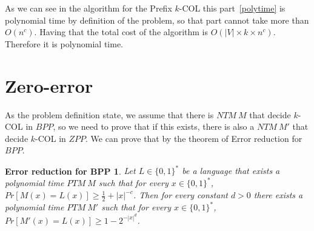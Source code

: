 \documentclass[12pt, a4paper]{article}
\begin{document}
As we can see in the algorithm for the Prefix $k$-COL this part~\ref{polytime} is polynomial time by definition of the problem, so that part cannot take more than $O(n^c)$. Having that the total cost of the algorithm is $O(|V| \times k \times n^c)$. Therefore it is polynomial time.

\section{Zero-error}
As the problem definition state, we assume that there is $NTM\ M$ that decide $k$-COL in $BPP$, so we need to prove that if this exists, there is also a $NTM\ M'$ that decide $k$-COL in $ZPP$. We can prove that by the theorem of Error reduction for $BPP$.

\newtheorem{bpperror}{Error reduction for BPP}\label{bpp:error}
\begin{bpperror}
  Let $L \in \{0,1\}^*$ be a language that exists a polynomial time $PTM\ M$ such that for every $x \in \{0,1\}^*$, $Pr[M(x)=L(x)] \geq \frac{1}{2} + |x|^{-c}$.
  Then for every constant $d > 0$ there exists a polynomial time $PTM\ M'$ such that for every $x \in \{0,1\}^*$, $Pr[M'(x)=L(x)] \geq 1 - 2^{-|x|^d}$.
\end{bpperror}
\end{document}
